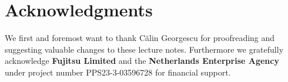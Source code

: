 \documentclass{nato-sto}
\begin{document}













\section*{Acknowledgments}
We first and foremost want to thank C\u{a}lin Georgescu for proofreading and suggesting valuable changes to these lecture notes. Furthermore we gratefully acknowledge \textbf{Fujitsu Limited} and the \textbf{Netherlands Enterprise Agency} under project number PPS23-3-03596728 for financial support.



\appendix




\end{document}
